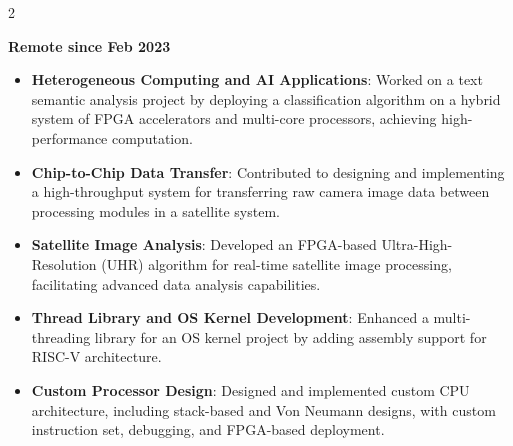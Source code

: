 \documentclass[10pt,a4paper,ragged2e,withhyper]{altacv}
\begin{document}
\begin{paracol}{2}


\divider


\divider




\divider


\textbf{\small{Remote since Feb 2023}}
\begin{itemize}
\item \textbf{Heterogeneous Computing and AI Applications}: Worked on a text semantic analysis project by deploying a classification algorithm on a hybrid system of FPGA accelerators and multi-core processors, achieving high-performance computation.
\item \textbf{Chip-to-Chip Data Transfer}: Contributed to designing and implementing a high-throughput system for transferring raw camera image data between processing modules in a satellite system.
\item \textbf{Satellite Image Analysis}: Developed an FPGA-based Ultra-High-Resolution (UHR) algorithm for real-time satellite image processing, facilitating advanced data analysis capabilities.
\item \textbf{Thread Library and OS Kernel Development}: Enhanced a multi-threading library for an OS kernel project by adding assembly support for RISC-V architecture.
\item \textbf{Custom Processor Design}: Designed and implemented custom CPU architecture, including stack-based and Von Neumann designs, with custom instruction set, debugging, and FPGA-based deployment.
\end{itemize}


\end{paracol}
\end{document}
